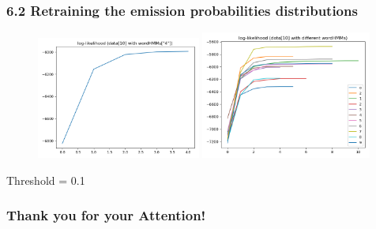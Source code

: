 \documentclass[t]{beamer}
\begin{document}
\begin{frame}
	\frametitle{6.2 Retraining the emission probabilities distributions}
	\begin{figure}
\centering
		\includegraphics[width=0.48\textwidth]{figures/621.png}
		\includegraphics[width=0.5\textwidth]{figures/62.png}
	\end{figure}

Threshold = 0.1

\end{frame}

\begin{frame}
	\frametitle{Thank you for your Attention!}	
\end{frame}
	
\end{document}
